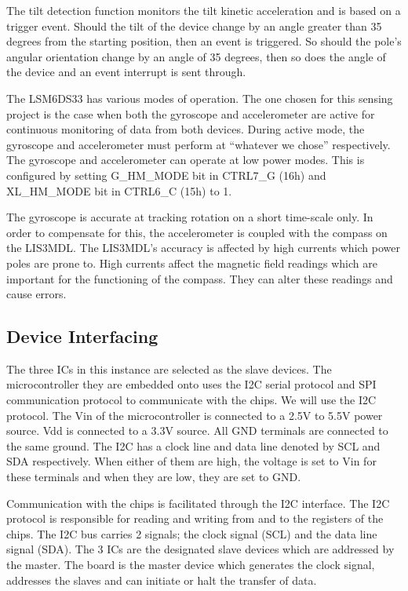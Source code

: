 \documentclass[12pt]{article}
\begin{document}
The tilt detection function monitors the tilt kinetic acceleration and is based on a trigger event. Should the tilt of 
the device change by an angle greater than 35 degrees from the starting position, then an event is triggered. So should 
the pole’s angular orientation change by an angle of 35 degrees, then so does the angle of the device and an event 
interrupt is sent through.

The LSM6DS33 has various modes of operation. The one chosen for this sensing project is the case when both the gyroscope
and accelerometer are active for continuous monitoring of data from both devices. During active mode, the gyroscope and 
accelerometer must perform at “whatever we chose” respectively. The gyroscope and accelerometer can operate at low power
modes. This is configured by setting G\_HM\_MODE bit in CTRL7\_G (16h) and XL\_HM\_MODE bit in CTRL6\_C (15h) to 1. 

The gyroscope is accurate at tracking rotation on a short time-scale only. In order to compensate for this, the 
accelerometer is coupled with the compass on the LIS3MDL.
The LIS3MDL’s accuracy is affected by high currents which power poles are prone to. High currents affect the magnetic 
field readings which are important for the functioning of the compass. They can alter these readings and cause errors.

\subsection{Device Interfacing}
The three ICs in this instance are selected as the slave devices. The microcontroller they are embedded onto uses the 
I2C serial protocol and SPI communication protocol to communicate with the chips. We will use the I2C protocol. 
The Vin of the microcontroller is connected to a 2.5V to 5.5V power source. Vdd is connected to a 3.3V source.
All GND terminals are connected to the same ground. The I2C has a clock line and data line denoted by SCL and SDA 
respectively. When either of them are high, the voltage is set to Vin for these terminals and when they are low, they 
are set to GND. 

Communication with the chips is facilitated through the I2C interface. 
The I2C protocol is responsible for reading and writing from and to the registers of the chips. 
The I2C bus carries 2 signals; the clock signal (SCL) and the data line signal (SDA). The 3 ICs are the designated slave
devices which are addressed by the master. The board is the master device which generates the clock signal, addresses 
the slaves and can initiate or halt the transfer of data.
\end{document}
